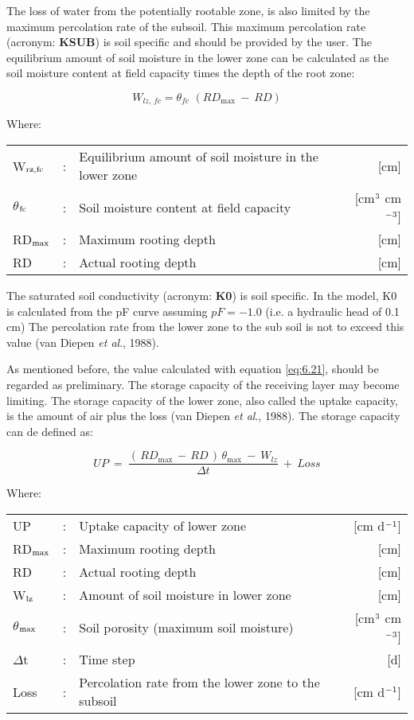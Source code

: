 The loss of water from the potentially rootable zone, is also limited by the maximum percolation rate of the subsoil. This maximum percolation rate (acronym: {\bf KSUB}) is soil specific and should be provided by the user. The equilibrium amount of soil moisture in the lower zone can be calculated as the soil moisture content at field capacity times the depth of the root zone:

\begin{equation}
\label{eq:6.24}
W_{lz,\, fc} = \theta_{fc} \,\, (RD_{\max} ~-~RD)
\end{equation}

Where:\\[5pt]
\begin{tabularx}{\textwidth}{llXr}
	W$_{{\rm rz,fc}}$ &:& Equilibrium amount of soil moisture in the lower zone  & [cm]\\
	$\theta$$_{{\rm fc}}$ &:& Soil moisture content at field capacity  & [cm$^{{\rm 3}}$ cm$^{{\rm -3}}$]\\
	RD$_{{\rm max}}$ &:& Maximum rooting depth  & [cm]\\
	RD &:& Actual rooting depth  & [cm]\\
\end{tabularx}

The saturated soil conductivity (acronym: {\bf K0}) is soil specific. In the model, K0 is calculated from the pF curve assuming $pF = -1.0$ (i.e. a hydraulic head of 0.1 cm) The percolation rate from the lower zone to the sub soil is not to exceed this value (van Diepen {\it et al}., 1988). 

As mentioned before, the value calculated with equation \ref{eq:6.21}, should be regarded as preliminary. The storage capacity of the receiving layer may become limiting. The storage capacity of the lower zone, also called the uptake capacity, is the amount of air plus the loss (van Diepen {\it et al}., 1988). The storage capacity can de defined as:

\begin{equation}
\label{eq:6.25}
UP  ~=~{\frac{(\, RD _{\max } \, -\, RD\, )\, \theta  _{\max } ~-~ W _{lz} }{\Delta t}} ~+~ Loss
\end{equation}

Where:\\[5pt]
\begin{tabularx}{\textwidth}{llXr}
	UP &:& Uptake capacity of lower zone  & [cm d$^{{\rm -1}}$]\\
	RD$_{{\rm max}}$ &:& Maximum rooting depth  & [cm]\\
	RD &:& Actual rooting depth  & [cm]\\
	W$_{{\rm lz}}$ &:& Amount of soil moisture in lower zone  & [cm]\\
	$\theta$$_{{\rm max}}$ &:& Soil porosity (maximum soil moisture)  & [cm$^{{\rm 3}}$ cm$^{{\rm -3}}$]\\
	$\Delta$t &:& Time step  & [d]\\
	Loss &:& Percolation rate from the lower zone to the subsoil   & [cm d$^{{\rm -1}}$]\\
\end{tabularx}

